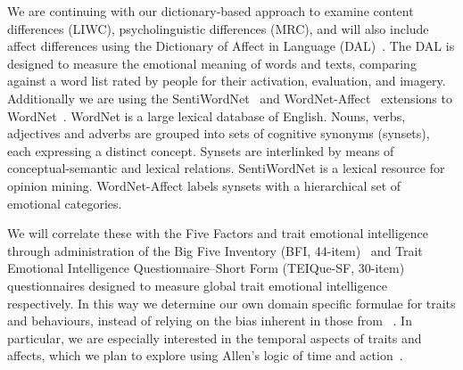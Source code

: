 \documentclass[letterpaper]{article}
\begin{document}
We are continuing with our dictionary-based approach to examine
content differences (LIWC), psycholinguistic differences (MRC), and
will also include affect differences using the Dictionary of Affect in
Language (DAL)~\cite{whissell:2008,whissell:2009}. The DAL is designed
to measure the emotional meaning of words and texts, comparing against
a word list rated by people for their activation, evaluation, and
imagery. Additionally we are using the
SentiWordNet~\cite{esuli+sebastiani:2006} and
WordNet-Affect~\cite{strapparava+valitutti:2004} extensions to
WordNet~\cite{miller:1995}. WordNet is a large lexical database of
English. Nouns, verbs, adjectives and adverbs are grouped into sets of
cognitive synonyms (synsets), each expressing a distinct
concept. Synsets are interlinked by means of conceptual-semantic and
lexical relations. SentiWordNet is a lexical resource for opinion
mining. WordNet-Affect labels synsets with a hierarchical set of
emotional categories.

We will correlate these with the Five Factors and trait emotional
intelligence~\cite{petrides+furnham:2001} through administration of
the Big Five Inventory (BFI, 44-item)~\cite{john-et-al:1991} and Trait
Emotional Intelligence Questionnaire--Short Form (TEIQue-SF, 30-item)
questionnaires designed to measure global trait emotional
intelligence~\cite{petrides+furnham:2006} respectively. In this way we
determine our own domain specific formulae for traits and behaviours,
instead of relying on the bias inherent in those from
\citeauthor{mairesse-et-al:2007}~. In
particular, we are especially interested in the temporal aspects of
traits and affects, which we plan to explore using Allen's logic of
time and action~\cite{allen:1983,allen:1984}.



\end{document}
